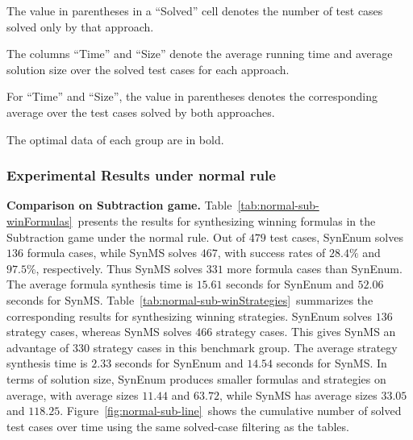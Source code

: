 \documentclass[review]{elsarticle}
\begin{document}
The value in parentheses in a ``Solved'' cell denotes the number of test cases solved only by that approach.

The columns ``Time'' and ``Size'' denote the average running time and average solution size over the solved test cases for each approach.

For ``Time'' and ``Size'', the value in parentheses denotes the corresponding average over the test cases solved by both approaches.

The optimal data of each group are in bold.

\subsubsection{Experimental Results under normal rule}

\textbf{Comparison on Subtraction game.}
Table~\ref{tab:normal-sub-winFormulas}~presents the results for synthesizing winning formulas in the Subtraction game under the normal rule.
Out of $479$ test cases, SynEnum solves $136$ formula cases, while SynMS solves $467$, with success rates of $28.4\%$ and $97.5\%$, respectively.
Thus SynMS solves $331$ more formula cases than SynEnum.
The average formula synthesis time is $15.61$ seconds for SynEnum and $52.06$ seconds for SynMS.
Table~\ref{tab:normal-sub-winStrategies}~summarizes the corresponding results for synthesizing winning strategies.
SynEnum solves $136$ strategy cases, whereas SynMS solves $466$ strategy cases.
This gives SynMS an advantage of $330$ strategy cases in this benchmark group.
The average strategy synthesis time is $2.33$ seconds for SynEnum and $14.54$ seconds for SynMS.
In terms of solution size, SynEnum produces smaller formulas and strategies on average, with average sizes $11.44$ and $63.72$, while SynMS has average sizes $33.05$ and $118.25$.
Figure~\ref{fig:normal-sub-line}~shows the cumulative number of solved test cases over time using the same solved-case filtering as the tables.
\end{document}
